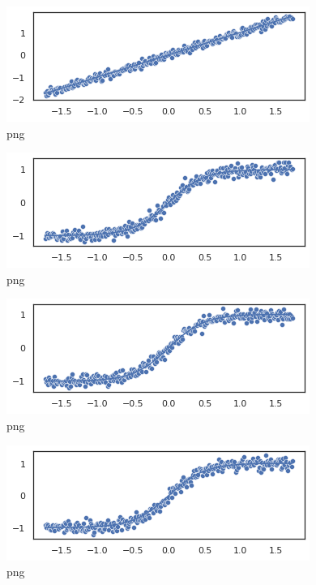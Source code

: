 \begin{figure}
\centering
\includegraphics{normality_and_linearity_violation_files/normality_and_linearity_violation_3_0.png}
\caption{png}
\end{figure}

\begin{figure}
\centering
\includegraphics{normality_and_linearity_violation_files/normality_and_linearity_violation_3_1.png}
\caption{png}
\end{figure}

\begin{figure}
\centering
\includegraphics{normality_and_linearity_violation_files/normality_and_linearity_violation_3_2.png}
\caption{png}
\end{figure}

\begin{figure}
\centering
\includegraphics{normality_and_linearity_violation_files/normality_and_linearity_violation_3_3.png}
\caption{png}
\end{figure}

